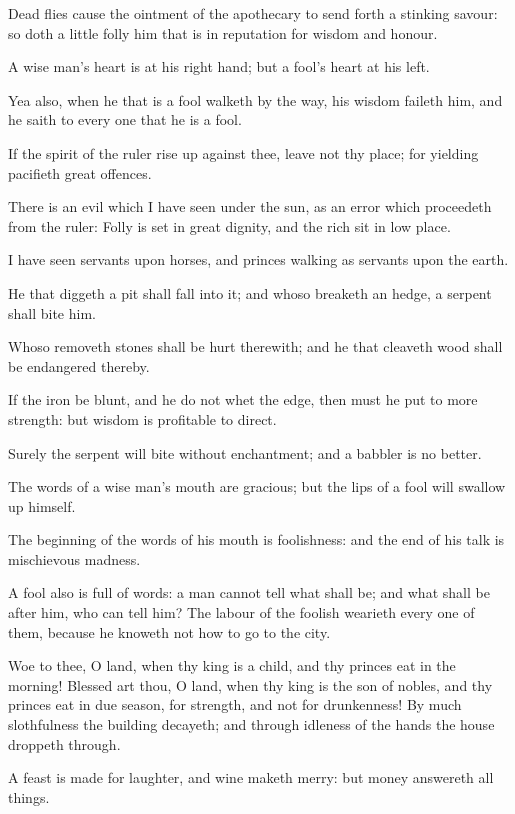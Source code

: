 \Chapter
\Verse Dead flies cause the ointment of the apothecary to send forth a stinking savour: so doth a little folly him that is in reputation for wisdom and honour.

\Verse A wise man's heart is at his right hand; but a fool's heart at his left.

\Verse Yea also, when he that is a fool walketh by the way, his wisdom faileth him, and he saith to every one that he is a fool.

\Verse If the spirit of the ruler rise up against thee, leave not thy place; for yielding pacifieth great offences.

\Verse There is an evil which I have seen under the sun, as an error which proceedeth from the ruler: \Verse Folly is set in great dignity, and the rich sit in low place.

\Verse I have seen servants upon horses, and princes walking as servants upon the earth.

\Verse He that diggeth a pit shall fall into it; and whoso breaketh an hedge, a serpent shall bite him.

\Verse Whoso removeth stones shall be hurt therewith; and he that cleaveth wood shall be endangered thereby.

\Verse If the iron be blunt, and he do not whet the edge, then must he put to more strength: but wisdom is profitable to direct.

\Verse Surely the serpent will bite without enchantment; and a babbler is no better.

\Verse The words of a wise man's mouth are gracious; but the lips of a fool will swallow up himself.

\Verse The beginning of the words of his mouth is foolishness: and the end of his talk is mischievous madness.

\Verse A fool also is full of words: a man cannot tell what shall be; and what shall be after him, who can tell him?  \Verse The labour of the foolish wearieth every one of them, because he knoweth not how to go to the city.

\Verse Woe to thee, O land, when thy king is a child, and thy princes eat in the morning!  \Verse Blessed art thou, O land, when thy king is the son of nobles, and thy princes eat in due season, for strength, and not for drunkenness!  \Verse By much slothfulness the building decayeth; and through idleness of the hands the house droppeth through.

\Verse A feast is made for laughter, and wine maketh merry: but money answereth all things.

